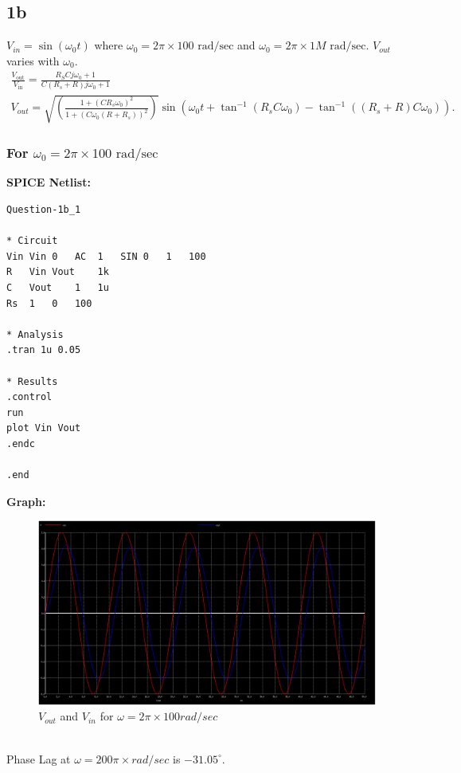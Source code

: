 \documentclass{article}
\begin{document}
\subsection{1b}
$V_{in} = \sin(\omega_0 t)$ where $\omega_0 = 2 \pi \times 100 \text{ rad/sec}$ and $\omega_0 = 2 \pi \times 1M \text{ rad/sec}$. $V_{out}$ varies with $\omega_0$.
\begin{align}
    \frac{V_{\text {out}}}{V_{\text {in}}}=\frac{R_{S}Cj\omega_0+1}{C(R_{s}+R)j\omega_0+1} \\
    V_{out} = \sqrt{\left(\frac{1 + (CR_s\omega_0)^2}{1 + (C\omega_0(R+R_s))^2}\right)} \sin \left(\omega_{0}t + \tan ^{-1}\left({R_{s}C\omega_{0}}\right) - \tan ^{-1}\left({(R_{s} + R)C\omega_{0}}\right)\right).
\end{align}

\subsubsection{For $\omega_0 = 2\pi\times100 \text{ rad/sec}$}
\textbf{SPICE Netlist:}
\begin{lstlisting}
Question-1b_1

* Circuit
Vin	Vin	0	AC	1	SIN	0	1	100
R	Vin	Vout	1k
C	Vout	1	1u
Rs	1	0	100

* Analysis
.tran 1u 0.05

* Results
.control
run
plot Vin Vout
.endc

.end
\end{lstlisting}

\textbf{Graph:}
\begin{figure}[!ht]
    \centering
    \includegraphics[scale=0.25]{Images/1b_1.png}
    \caption{$V_{out}$ and $V_{in}$ for $\omega = 2\pi \times 100 rad/sec$}
\end{figure}\\
Phase Lag at $\omega = 200\pi\times rad/sec$ is $-31.05^{\circ}$.
\end{document}
